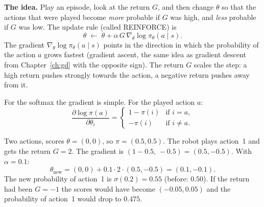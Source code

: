 \begin{center}
\label{fig:rl3_softmax}
\end{center}

\textbf{The idea.} Play an episode, look at the return $G$, and then change $\theta$ so that the actions that were played become \emph{more} probable if $G$ was high, and \emph{less} probable if $G$ was low. The update rule (called REINFORCE) is
\[
\theta\;\leftarrow\;\theta+\alpha\,G\,\nabla_\theta\log\pi_\theta(a\mid s).
\]
The gradient $\nabla_\theta\log\pi_\theta(a\mid s)$ points in the direction in which the probability of the action $a$ grows fastest (gradient ascent, the same idea as gradient descent from Chapter~\ref{ch:gd} with the opposite sign). The return $G$ scales the step: a high return pushes strongly towards the action, a negative return pushes away from it.

For the softmax the gradient is simple. For the played action $a$:
\[
\frac{\partial\log\pi(a)}{\partial\theta_i}=\begin{cases}1-\pi(i)&\text{if }i=a,\\-\pi(i)&\text{if }i\ne a.\end{cases}
\]

\begin{example}
Two actions, scores $\theta=(0,0)$, so $\pi=(0.5,0.5)$. The robot plays action~1 and gets the return $G=2$. The gradient is $(1-0.5,\,-0.5)=(0.5,-0.5)$. With $\alpha=0.1$:
\[
\theta_{\text{new}}=(0,0)+0.1\cdot2\cdot(0.5,-0.5)=(0.1,-0.1).
\]
The new probability of action~1 is $\sigma(0.2)=0.55$ (before: $0.50$). If the return had been $G=-1$ the scores would have become $(-0.05,0.05)$ and the probability of action~1 would drop to $0.475$.
\end{example}

